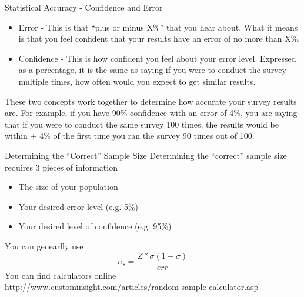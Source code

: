 \documentclass[10pt, compress]{beamer}
\begin{document}
\begin{frame}[t]{Statistical Accuracy - Confidence and Error}
    \begin{itemize}
        \item \alert{Error} - This is that ``plus or minus X\%'' that you hear about. What it means is that you feel confident that your results have an error of no more than X\%.
        \item \alert{Confidence} - This is how confident you feel about your error level. Expressed as a percentage, it is the same as saying if you were to conduct the survey multiple times, how often would you expect to get similar results.
    \end{itemize}
    \smallskip
    These two concepts work together to determine how accurate your survey results are. For example, if you have 90\% confidence with an error of 4\%, you are saying that if you were to conduct the same survey 100 times, the results would be within $\pm$ 4\% of the first time you ran the survey 90 times out of 100.
\end{frame}

\begin{frame}[t]{Determining the ``Correct'' Sample Size}
    Determining the ``correct'' sample size requires 3 pieces of information
    \begin{itemize}
        \item The size of your population
        \item Your desired error level (e.g. 5\%)
        \item Your desired level of confidence (e.g. 95\%)
    \end{itemize}
    You can genearlly use
    \begin{equation}
        n_s = \frac{Z*\sigma(1-\sigma)}{err}
    \end{equation}
    You can find calculators online \\
    \url{http://www.custominsight.com/articles/random-sample-calculator.asp}
\end{frame}
\end{document}
